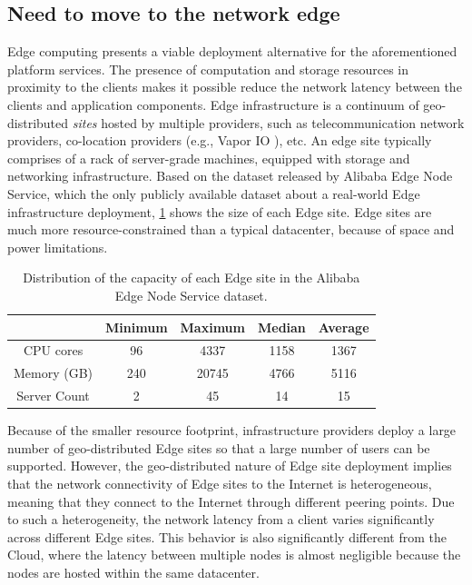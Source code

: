 \subsection{Need to move to the network edge}
Edge computing \cite{ramachandran2021case} presents a viable deployment alternative for the aforementioned platform services. The presence of computation and storage resources in proximity to the clients makes it possible reduce the network latency between the clients and application components. Edge infrastructure is a continuum of geo-distributed \emph{sites} hosted by multiple providers, such as telecommunication network providers, co-location providers (e.g., Vapor IO \cite{vaporio}), etc. An edge site typically comprises of a rack of server-grade machines, equipped with storage and networking infrastructure. Based on the dataset \cite{xu2021cloud} released by Alibaba Edge Node Service, which the only publicly available dataset about a real-world Edge infrastructure deployment, \cref{table:edge_capacity} shows the size of each Edge site. Edge sites are much more resource-constrained than a typical datacenter, because of space and power limitations. 
\begin{table}[h!]
\centering
 \begin{tabular}{||c | c | c | c | c ||} 
 \hline
  & Minimum & Maximum & Median & Average \\ [0.5ex] 
 \hline\hline
 CPU cores      & 96  & 4337 & 1158 & 1367 \\ 
 \hline
 Memory (GB)    &  240 & 20745 & 4766 & 5116\\
 \hline
 Server Count   &  2 & 45 & 14 & 15 \\
 \hline
 \end{tabular}
 \label{table:edge_capacity}
 \caption{Distribution of the capacity of each Edge site in the Alibaba Edge Node Service dataset.}
\end{table}

Because of the smaller resource footprint, infrastructure providers deploy a large number of geo-distributed Edge sites so that a large number of users can be supported. However, the geo-distributed nature of Edge site deployment implies that the network connectivity of Edge sites to the Internet is heterogeneous, meaning that they connect to the Internet through different peering points. Due to such a heterogeneity, the network latency from a client varies significantly across different Edge sites. This behavior is also significantly different from the Cloud, where the latency between multiple nodes is almost negligible because the nodes are hosted within the same datacenter. 

